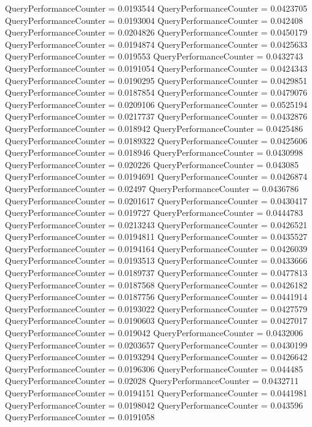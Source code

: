 \documentclass[9pt]{article}
\theoremstyle{plain}
\theoremstyle{definition}
\theoremstyle{remark}
\numberwithin{equation}{section}
\begin{document}
QueryPerformanceCounter  =  0.0193544
QueryPerformanceCounter  =  0.0423705
QueryPerformanceCounter  =  0.0193004
QueryPerformanceCounter  =  0.042408
QueryPerformanceCounter  =  0.0204826
QueryPerformanceCounter  =  0.0450179
QueryPerformanceCounter  =  0.0194874
QueryPerformanceCounter  =  0.0425633
QueryPerformanceCounter  =  0.019553
QueryPerformanceCounter  =  0.0432743
QueryPerformanceCounter  =  0.0191054
QueryPerformanceCounter  =  0.0424343
QueryPerformanceCounter  =  0.0190295
QueryPerformanceCounter  =  0.0429851
QueryPerformanceCounter  =  0.0187854
QueryPerformanceCounter  =  0.0479076
QueryPerformanceCounter  =  0.0209106
QueryPerformanceCounter  =  0.0525194
QueryPerformanceCounter  =  0.0217737
QueryPerformanceCounter  =  0.0432876
QueryPerformanceCounter  =  0.018942
QueryPerformanceCounter  =  0.0425486
QueryPerformanceCounter  =  0.0189322
QueryPerformanceCounter  =  0.0425606
QueryPerformanceCounter  =  0.018946
QueryPerformanceCounter  =  0.0430998
QueryPerformanceCounter  =  0.020226
QueryPerformanceCounter  =  0.043085
QueryPerformanceCounter  =  0.0194691
QueryPerformanceCounter  =  0.0426874
QueryPerformanceCounter  =  0.02497
QueryPerformanceCounter  =  0.0436786
QueryPerformanceCounter  =  0.0201617
QueryPerformanceCounter  =  0.0430417
QueryPerformanceCounter  =  0.019727
QueryPerformanceCounter  =  0.0444783
QueryPerformanceCounter  =  0.0213243
QueryPerformanceCounter  =  0.0426521
QueryPerformanceCounter  =  0.0194811
QueryPerformanceCounter  =  0.0435527
QueryPerformanceCounter  =  0.0194164
QueryPerformanceCounter  =  0.0426039
QueryPerformanceCounter  =  0.0193513
QueryPerformanceCounter  =  0.0433666
QueryPerformanceCounter  =  0.0189737
QueryPerformanceCounter  =  0.0477813
QueryPerformanceCounter  =  0.0187568
QueryPerformanceCounter  =  0.0426182
QueryPerformanceCounter  =  0.0187756
QueryPerformanceCounter  =  0.0441914
QueryPerformanceCounter  =  0.0193022
QueryPerformanceCounter  =  0.0427579
QueryPerformanceCounter  =  0.0190603
QueryPerformanceCounter  =  0.0427017
QueryPerformanceCounter  =  0.019042
QueryPerformanceCounter  =  0.0432006
QueryPerformanceCounter  =  0.0203657
QueryPerformanceCounter  =  0.0430199
QueryPerformanceCounter  =  0.0193294
QueryPerformanceCounter  =  0.0426642
QueryPerformanceCounter  =  0.0196306
QueryPerformanceCounter  =  0.044485
QueryPerformanceCounter  =  0.02028
QueryPerformanceCounter  =  0.0432711
QueryPerformanceCounter  =  0.0194151
QueryPerformanceCounter  =  0.0441981
QueryPerformanceCounter  =  0.0198042
QueryPerformanceCounter  =  0.043596
QueryPerformanceCounter  =  0.0191058
\end{document}
